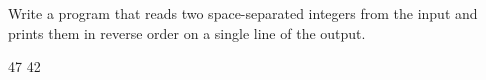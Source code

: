 




Write a program that reads two space-separated integers from the input and prints them in reverse order on a single line of the output.

47
42
\koniec


